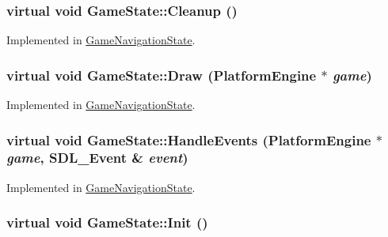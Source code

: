 \hypertarget{class_game_state_041e7a5430d71da84745af11abdacd93}{
\subsubsection[{Cleanup}]{\setlength{\rightskip}{0pt plus 5cm}virtual void GameState::Cleanup ()}}
\label{class_game_state_041e7a5430d71da84745af11abdacd93}




Implemented in \hyperlink{class_game_navigation_state_f93a7dbb7eac4b14a6d59cbca32b9abd}{GameNavigationState}.\hypertarget{class_game_state_7333dda0f49b3fa1c01cd3295f853024}{
\subsubsection[{Draw}]{\setlength{\rightskip}{0pt plus 5cm}virtual void GameState::Draw ({\bf PlatformEngine} $\ast$ {\em game})}}
\label{class_game_state_7333dda0f49b3fa1c01cd3295f853024}




Implemented in \hyperlink{class_game_navigation_state_a37dce070a906454c512192c067fda09}{GameNavigationState}.\hypertarget{class_game_state_82a31f1480fc637829d6630c01570d4c}{
\subsubsection[{HandleEvents}]{\setlength{\rightskip}{0pt plus 5cm}virtual void GameState::HandleEvents ({\bf PlatformEngine} $\ast$ {\em game}, \/  SDL\_\-Event \& {\em event})}}
\label{class_game_state_82a31f1480fc637829d6630c01570d4c}




Implemented in \hyperlink{class_game_navigation_state_c47e8f7b8802e7b7e7b5076c20313596}{GameNavigationState}.\hypertarget{class_game_state_eec488593bae214c0f738bd64dafba32}{
\subsubsection[{Init}]{\setlength{\rightskip}{0pt plus 5cm}virtual void GameState::Init ()}}
\label{class_game_state_eec488593bae214c0f738bd64dafba32}




